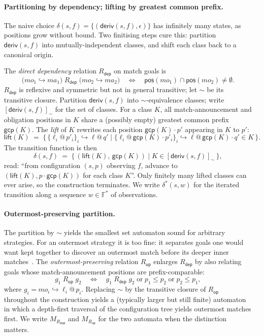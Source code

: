\documentclass[11pt]{article}
\theoremstyle{plain}
\theoremstyle{definition}
\theoremstyle{remark}
\newcommand{\rdep}{R_{\mathsf{dep}}}
\newcommand{\rop}{R_{\mathsf{op}}}
\newcommand{\gcp}{\mathsf{gcp}}
\newcommand{\deriv}{\mathsf{deriv}}
\newcommand{\lift}{\mathsf{lift}}
\begin{document}
\paragraph{Partitioning by dependency; lifting by greatest common prefix.}
The naive choice $\delta(s, f) = \{(\deriv(s, f), \epsilon)\}$ has
infinitely many states, as positions grow without bound. Two finitising
steps cure this: partition $\deriv(s, f)$ into mutually-independent
classes, and shift each class back to a canonical origin.

The \emph{direct dependency} relation $\rdep$ on match goals is
\[
  \bigl(\mathit{mo}_{1} \hookrightarrow \mathit{ma}_{1}\bigr)
  \;\rdep\;
  \bigl(\mathit{mo}_{2} \hookrightarrow \mathit{ma}_{2}\bigr)
  \quad\Longleftrightarrow\quad
  \mathsf{pos}(\mathit{mo}_{1}) \cap \mathsf{pos}(\mathit{mo}_{2}) \neq \emptyset.
\]
$\rdep$ is reflexive and symmetric but not in general transitive; let
$\sim$ be its transitive closure. Partition $\deriv(s, f)$ into
$\sim$-equivalence classes; write $[\deriv(s, f)]_{\sim}$ for the set of
classes. For a class $K$, all match-announcement and obligation
positions in $K$ share a (possibly empty) greatest common prefix
$\gcp(K)$. The \emph{lift} of $K$ rewrites each position
$\gcp(K) \cdot p'$ appearing in $K$ to $p'$:
\[
  \lift(K) \;=\;
  \{\, \{\ell_{i}@\, p'_{i}\}_{i} \hookrightarrow \ell @\, q'
       \mid \{\ell_{i}@\, \gcp(K) \cdot p'_{i}\}_{i}
            \hookrightarrow \ell @\, \gcp(K) \cdot q' \in K \,\}.
\]
The transition function is then
\[
  \delta(s, f) \;=\; \{\, (\lift(K),\, \gcp(K)) \mid K \in [\deriv(s, f)]_{\sim} \,\},
\]
read: ``from configuration $(s, p)$ observing $f$, advance to
$(\lift(K), p \cdot \gcp(K))$ for each class $K$''. Only finitely many
lifted classes can ever arise, so the construction terminates. We write
$\delta^{*}(s, w)$ for the iterated transition along a sequence
$w \in \mathbb{F}^{*}$ of observations.

\paragraph{Outermost-preserving partition.}
The partition by $\sim$ yields the smallest set automaton sound for
arbitrary strategies. For an outermost strategy it is too fine: it
separates goals one would want kept together to discover an outermost
match before its deeper inner matches~\cite[\S 7]{BouwmanErkens2022}.
The \emph{outermost-preserving} relation $\rop$ enlarges $\rdep$ by
also relating goals whose match-announcement positions are
prefix-comparable:
\[
  g_{1} \;\rop\; g_{2}
  \quad\Longleftrightarrow\quad
  g_{1} \;\rdep\; g_{2}
  \;\text{or}\;
  p_{1} \le p_{2}
  \;\text{or}\;
  p_{2} \le p_{1},
\]
where $g_{i} = \mathit{mo}_{i} \hookrightarrow \ell_{i} @\, p_{i}$.
Replacing $\sim$ by the transitive closure of $\rop$ throughout the
construction yields a (typically larger but still finite) automaton in
which a depth-first traversal of the configuration tree yields
outermost matches first. We write $M_{\rdep}$ and $M_{\rop}$ for the
two automata when the distinction matters.
\end{document}
